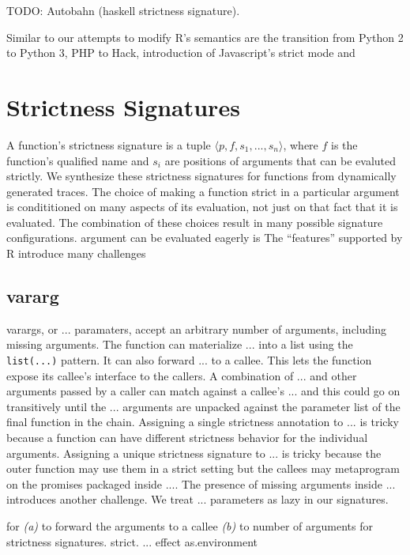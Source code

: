 \documentclass[screen,acmsmall]{acmart}
\newcommand{\code}[1]{\lstinline[style=R]|#1|\xspace}
\begin{document}
TODO: Autobahn (haskell strictness signature).

Similar to our attempts to modify R's semantics are the transition from Python 2
to Python 3, PHP to Hack, introduction of Javascript's strict mode and 

\section{Strictness Signatures}

A function's strictness signature is a tuple $\langle p, f, s_1, ..., s_n
\rangle$, where $f$ is the function's qualified name and $s_i$ are positions of
arguments that can be evaluted strictly. We synthesize these strictness
signatures for functions from dynamically generated traces. The choice of making
a function strict in a particular argument is condititioned on many aspects of
its evaluation, not just on that fact that it is evaluated. The combination of
these choices result in many possible signature configurations.
argument can be evaluated eagerly is The ``features'' supported by R introduce
many challenges

\subsection{vararg}
varargs, or $...$ paramaters, accept an arbitrary number of arguments, including
missing arguments. The function can materialize $...$ into a list using the
\code{list(...)} pattern. It can also forward $...$ to a callee. This lets the
function expose its callee's interface to the callers. A combination of $...$
and other arguments passed by a caller can match against a callee's $...$ and
this could go on transitively until the $...$ arguments are unpacked against the
parameter list of the final function in the chain. Assigning a single strictness
annotation to $...$ is tricky because a function can have different
strictness behavior for the individual arguments. Assigning a unique strictness
signature to $...$ is tricky because the outer function may use them in a strict
setting but the callees may metaprogram on the promises packaged inside $...$.
The presence of missing arguments inside $...$ introduces another challenge.
We treat $...$ parameters as lazy in our signatures.


 


for
\emph{(a)} to forward the arguments to a callee \emph{(b)} to number of
arguments for strictness signatures. strict. ... effect as.environment
\end{document}
